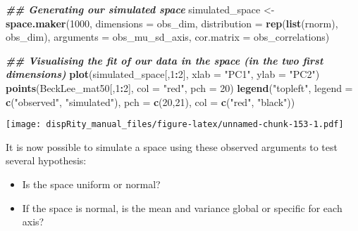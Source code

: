\documentclass[
]{book}
\newenvironment{Shaded}{\begin{snugshade}}{\end{snugshade}}
\newcommand{\AttributeTok}[1]{\textcolor[rgb]{0.13,0.29,0.53}{#1}}
\newcommand{\DecValTok}[1]{\textcolor[rgb]{0.00,0.00,0.81}{#1}}
\newcommand{\DocumentationTok}[1]{\textcolor[rgb]{0.56,0.35,0.01}{\textbf{\textit{#1}}}}
\newcommand{\FunctionTok}[1]{\textcolor[rgb]{0.13,0.29,0.53}{\textbf{#1}}}
\newcommand{\NormalTok}[1]{#1}
\newcommand{\OtherTok}[1]{\textcolor[rgb]{0.56,0.35,0.01}{#1}}
\newcommand{\SpecialCharTok}[1]{\textcolor[rgb]{0.81,0.36,0.00}{\textbf{#1}}}
\newcommand{\StringTok}[1]{\textcolor[rgb]{0.31,0.60,0.02}{#1}}
\providecommand{\tightlist}{%
  \setlength{\itemsep}{0pt}\setlength{\parskip}{0pt}}
\begin{document}
\begin{Shaded}
\begin{Highlighting}[]
\DocumentationTok{\#\# Generating our simulated space}
\NormalTok{simulated\_space }\OtherTok{\textless{}{-}} \FunctionTok{space.maker}\NormalTok{(}\DecValTok{1000}\NormalTok{, }\AttributeTok{dimensions =}\NormalTok{ obs\_dim, }
                               \AttributeTok{distribution =} \FunctionTok{rep}\NormalTok{(}\FunctionTok{list}\NormalTok{(rnorm), obs\_dim),}
                               \AttributeTok{arguments =}\NormalTok{ obs\_mu\_sd\_axis,}
                               \AttributeTok{cor.matrix =}\NormalTok{ obs\_correlations)}

\DocumentationTok{\#\# Visualising the fit of our data in the space (in the two first dimensions)}
\FunctionTok{plot}\NormalTok{(simulated\_space[,}\DecValTok{1}\SpecialCharTok{:}\DecValTok{2}\NormalTok{], }\AttributeTok{xlab =} \StringTok{"PC1"}\NormalTok{, }\AttributeTok{ylab =} \StringTok{"PC2"}\NormalTok{)}
\FunctionTok{points}\NormalTok{(BeckLee\_mat50[,}\DecValTok{1}\SpecialCharTok{:}\DecValTok{2}\NormalTok{], }\AttributeTok{col =} \StringTok{"red"}\NormalTok{, }\AttributeTok{pch =} \DecValTok{20}\NormalTok{)}
\FunctionTok{legend}\NormalTok{(}\StringTok{"topleft"}\NormalTok{, }\AttributeTok{legend =} \FunctionTok{c}\NormalTok{(}\StringTok{"observed"}\NormalTok{, }\StringTok{"simulated"}\NormalTok{),}
        \AttributeTok{pch =} \FunctionTok{c}\NormalTok{(}\DecValTok{20}\NormalTok{,}\DecValTok{21}\NormalTok{), }\AttributeTok{col =} \FunctionTok{c}\NormalTok{(}\StringTok{"red"}\NormalTok{, }\StringTok{"black"}\NormalTok{))}
\end{Highlighting}
\end{Shaded}

\texttt{[image: dispRity\_manual\_files/figure-latex/unnamed-chunk-153-1.pdf]}

It is now possible to simulate a space using these observed arguments to test several hypothesis:

\begin{itemize}
\tightlist
\item
  Is the space uniform or normal?
\item
  If the space is normal, is the mean and variance global or specific for each axis?
\end{itemize}
\end{document}
